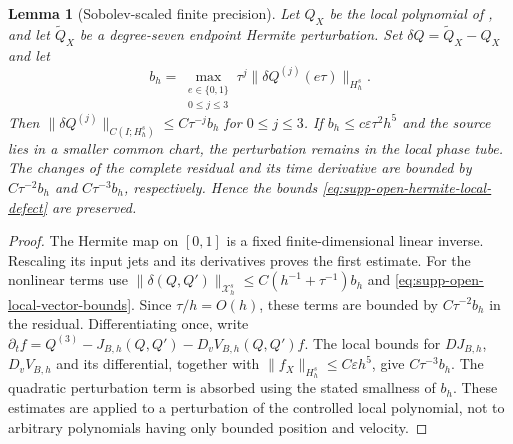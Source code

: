 \documentclass[11pt]{article}
\numberwithin{equation}{section}
\newtheorem{lemma}[lemma]{Lemma}
\theoremstyle{definition}
\theoremstyle{remark}
\begin{document}
\begin{lemma}[Sobolev-scaled finite precision]
\label{lem:supp-open-hermite-precision}
Let $Q_X$ be the local polynomial of
, and let $\widetilde Q_X$ be a
degree-seven endpoint Hermite perturbation. Set $\delta Q=\widetilde Q_X-Q_X$ and let
\begin{equation}
 b_h=\max_{\substack{e\in\{0,1\}\\0\le j\le3}}
       \tau^j\|\delta Q^{(j)}(e\tau)\|_{H_h^s}.
 \label{eq:supp-open-hermite-precision}
\end{equation}
Then $\|\delta Q^{(j)}\|_{C(I;H_h^s)}\le C\tau^{-j}b_h$
for $0\le j\le3$. If $b_h\le c\varepsilon\tau^2h^5$ and the
source lies in a smaller common chart, the perturbation remains in the
local phase tube. The changes of the complete residual and its time
derivative are bounded by $C\tau^{-2}b_h$ and $C\tau^{-3}b_h$,
respectively. Hence the bounds \eqref{eq:supp-open-hermite-local-defect}
are preserved.
\end{lemma}
\begin{proof}
The Hermite map on $[0,1]$ is a fixed finite-dimensional linear inverse.
Rescaling its input jets and its derivatives proves the first estimate.
For the nonlinear terms use
$\|\delta(Q,Q')\|_{\mathcal X_h^s}
\le C(h^{-1}+\tau^{-1})b_h$ and
\eqref{eq:supp-open-local-vector-bounds}.  Since $\tau/h=O(h)$,
these terms are bounded by $C\tau^{-2}b_h$ in the residual.  Differentiating
once, write $\partial_tf=Q^{(3)}-J_{B,h}(Q,Q')
-D_vV_{B,h}(Q,Q')f$.
The local bounds for $DJ_{B,h}$, $D_vV_{B,h}$ and its differential,
together with $\|f_X\|_{H_h^s}\le C\varepsilon h^5$, give
$C\tau^{-3}b_h$. The quadratic perturbation term is absorbed using
the stated smallness of $b_h$. These estimates are applied to a
perturbation of the controlled local polynomial, not to arbitrary
polynomials having only bounded position and velocity.
\end{proof}
\end{document}
